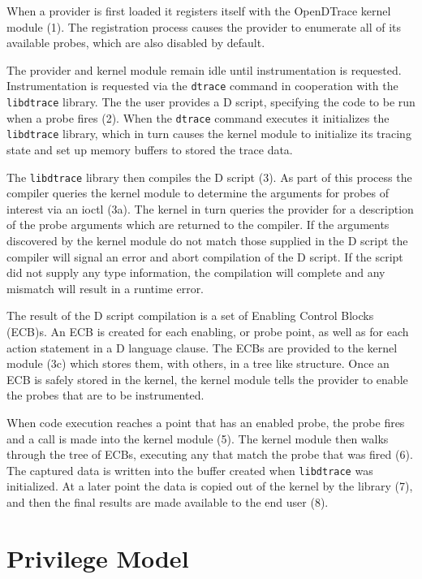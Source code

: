 When a provider is first loaded it registers itself with the
OpenDTrace kernel module (1). The registration process causes the
provider to enumerate all of its available probes, which are also
disabled by default.

The provider and kernel module remain idle until instrumentation is
requested. Instrumentation is requested via the \texttt{dtrace}
command in cooperation with the \texttt{libdtrace} library.  The the
user provides a D script, specifying the code to be run when a probe
fires (2). When the \texttt{dtrace} command executes it initializes
the \texttt{libdtrace} library, which in turn causes the kernel module
to initialize its tracing state and set up memory buffers to stored
the trace data.

The \texttt{libdtrace} library then compiles the D script (3). As part
of this process the compiler queries the kernel module to determine
the arguments for probes of interest via an ioctl (3a). The kernel in
turn queries the provider for a description of the probe arguments
which are returned to the compiler.  If the arguments discovered by
the kernel module do not match those supplied in the D script the
compiler will signal an error and abort compilation of the D script.
If the script did not supply any type information, the compilation
will complete and any mismatch will result in a runtime error.

The result of the D script compilation is a set of Enabling Control Blocks
(ECB)s.  An ECB is created for each enabling, or probe point, as well
as for each action statement in a D language clause.
The ECBs are provided to the kernel module (3c) which stores them,
with others, in a tree like structure. Once an ECB is safely stored in
the kernel, the kernel module tells the provider to enable the probes
that are to be instrumented.

When code execution reaches a point that has an enabled probe, the
probe fires and a call is made into the kernel module (5). The kernel
module then walks through the tree of ECBs, executing any that match
the probe that was fired (6). The captured data is written into the
buffer created when \texttt{libdtrace} was initialized. At a later
point the data is copied out of the kernel by the library (7), and
then the final results are made available to the end user (8).

\section{Privilege Model}
\label{sec:privilege}

